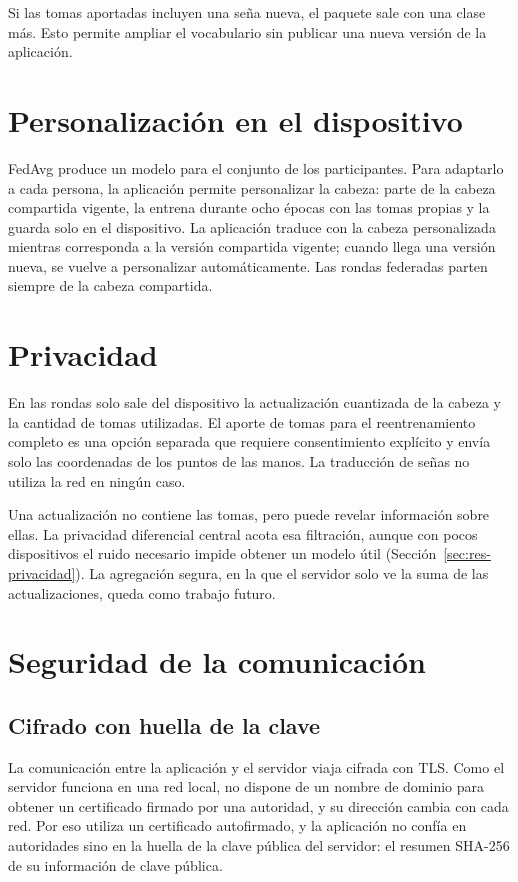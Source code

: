 Si las tomas aportadas incluyen una seña nueva, el paquete sale con una clase más. Esto permite ampliar el vocabulario sin publicar una nueva versión de la aplicación.

\section{Personalización en el dispositivo}

FedAvg produce un modelo para el conjunto de los participantes. Para adaptarlo a cada persona, la aplicación permite personalizar la cabeza: parte de la cabeza compartida vigente, la entrena durante ocho épocas con las tomas propias y la guarda solo en el dispositivo. La aplicación traduce con la cabeza personalizada mientras corresponda a la versión compartida vigente; cuando llega una versión nueva, se vuelve a personalizar automáticamente. Las rondas federadas parten siempre de la cabeza compartida.

\section{Privacidad}

En las rondas solo sale del dispositivo la actualización cuantizada de la cabeza y la cantidad de tomas utilizadas. El aporte de tomas para el reentrenamiento completo es una opción separada que requiere consentimiento explícito y envía solo las coordenadas de los puntos de las manos. La traducción de señas no utiliza la red en ningún caso.

Una actualización no contiene las tomas, pero puede revelar información sobre ellas. La privacidad diferencial central acota esa filtración, aunque con pocos dispositivos el ruido necesario impide obtener un modelo útil (Sección~\ref{sec:res-privacidad}). La agregación segura, en la que el servidor solo ve la suma de las actualizaciones, queda como trabajo futuro.

\section{Seguridad de la comunicación}
\label{sec:seguridad-federado}

\subsection{Cifrado con huella de la clave}

La comunicación entre la aplicación y el servidor viaja cifrada con TLS. Como el servidor funciona en una red local, no dispone de un nombre de dominio para obtener un certificado firmado por una autoridad, y su dirección cambia con cada red. Por eso utiliza un certificado autofirmado, y la aplicación no confía en autoridades sino en la huella de la clave pública del servidor: el resumen SHA-256 de su información de clave pública.

